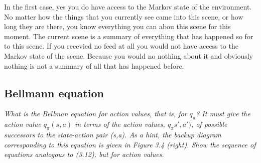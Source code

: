 \documentclass[12pt,a4paper]{article}
\begin{document}
In the first case, yes you do have access to the Markov state of the environment. No matter how the things that you currently see came into this scene, or how long they are there, you know everything you can abou this scene for this moment. The current scene is a summary of everything that has happened so for to this scene. 
If you recevied no feed at all you would not have access to the Markov state of the scene. Because you would no nothing about it and obviously nothing is not a summary of all that has happened before. 

\subsection{Bellmann equation}
\textit{What is the Bellman equation for action values, that is, for $q_{\pi}$? It must give the action value $q_{\pi}(s,a)$ in terms of the action values, $q_{\pi}s',a')$, of possible successors to the state-action pair (s,a). As a hint, the backup diagram corresponding to this equation is given in Figure 3.4 (right). Show the sequence of equations analogous to (3.12), but for action values.}
\end{document}
